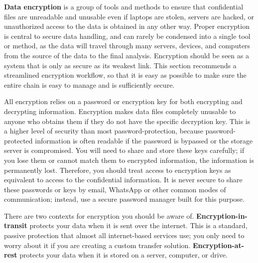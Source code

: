\textbf{Data encryption} is a group of tools and methods
to ensure that confidential files are unreadable and unusable
even if laptops are stolen, servers are hacked,
or unauthorized access to the data is obtained in any other way.
Proper encryption is central to secure data handling,
and can rarely be condensed into a single tool or method,
as the data will travel through many servers, devices, and computers
from the source of the data to the final analysis.
Encryption should be seen as a system
that is only as secure as its weakest link.
This section recommends a streamlined encryption workflow,
so that it is easy as possible to make sure
the entire chain is easy to manage and is sufficiently secure.

All encryption relies on a password or encryption key
for both encrypting and decrypting information.
Encryption makes data files completely unusable
to anyone who obtains them if they do not have the specific decryption key.
This is a higher level of security than most password-protection,
because password-protected information is often readable
if the password is bypassed or the storage server is compromised.
You will need to share and store these keys carefully;
if you lose them or cannot match them to encrypted information,
the information is permanently lost.
Therefore, you should treat access to encryption keys
as equivalent to access to the confidential information.
It is never secure to share these passwords or keys by email,
WhatsApp or other common modes of communication;
instead, use a secure password manager built for this purpose.

There are two contexts for encryption you should be aware of.
\textbf{Encryption-in-transit} protects your data
when it is sent over the internet.
This is a standard, passive protection that almost all internet-based services use;
you only need to worry about it if you are creating a custom transfer solution.
\textbf{Encryption-at-rest} protects your data
when it is stored on a server, computer, or drive.

